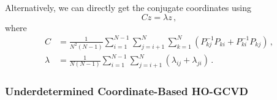 \documentclass[10pt]{article}
\begin{document}
Alternatively, we can directly get the conjugate coordinates using
\begin{equation}
     C z = \lambda z \,,
\end{equation}
where
\begin{equation}
\begin{aligned}
    C & = \frac{1}{N^2(N-1)}\sum_{i=1}^{N-1} \sum_{j=i+1}^N\sum_{k=1}^N \left(P_{kj}^{-1}P_{ki}+P_{ki}^{-1}P_{kj}\right)\,,\\
    \lambda & = \frac{1}{N(N-1)}\sum_{i=1}^{N-1} \sum_{j=i+1}^N \left(\lambda_{ij}+\lambda_{ji}\right)\,.
\end{aligned}    
\end{equation}

\subsubsection{Underdetermined Coordinate-Based HO-GCVD}
\end{document}
